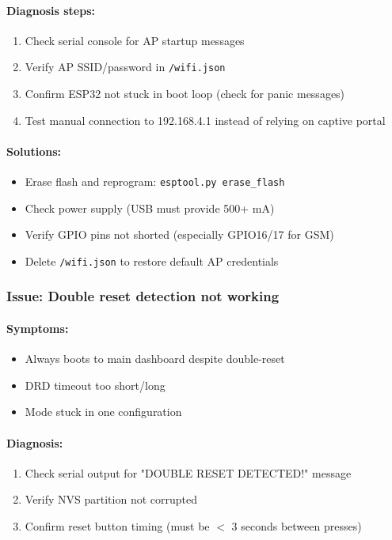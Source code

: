 \documentclass[11pt,a4paper]{article}
\begin{document}
\paragraph{Diagnosis steps:}
\begin{enumerate}[leftmargin=*]
  \item Check serial console for AP startup messages
  \item Verify AP SSID/password in \texttt{/wifi.json}
  \item Confirm ESP32 not stuck in boot loop (check for panic messages)
  \item Test manual connection to 192.168.4.1 instead of relying on captive portal
\end{enumerate}

\paragraph{Solutions:}
\begin{itemize}[leftmargin=*]
  \item Erase flash and reprogram: \texttt{esptool.py erase\_flash}
  \item Check power supply (USB must provide 500+ mA)
  \item Verify GPIO pins not shorted (especially GPIO16/17 for GSM)
  \item Delete \texttt{/wifi.json} to restore default AP credentials
\end{itemize}

\subsubsection{Issue: Double reset detection not working}

\paragraph{Symptoms:}
\begin{itemize}[leftmargin=*]
  \item Always boots to main dashboard despite double-reset
  \item DRD timeout too short/long
  \item Mode stuck in one configuration
\end{itemize}

\paragraph{Diagnosis:}
\begin{enumerate}[leftmargin=*]
  \item Check serial output for "DOUBLE RESET DETECTED!" message
  \item Verify NVS partition not corrupted
  \item Confirm reset button timing (must be $<$ 3 seconds between presses)
\end{enumerate}
\end{document}
